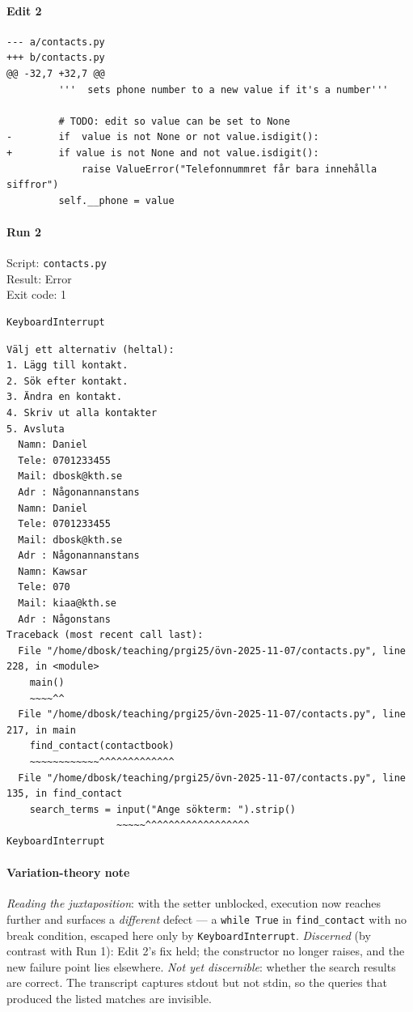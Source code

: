 \documentclass{article}
\begin{document}
\noindent
\begin{minipage}[t]{0.48\linewidth}
\paragraph{Edit 2}
\begin{verbatim}
--- a/contacts.py
+++ b/contacts.py
@@ -32,7 +32,7 @@
         '''  sets phone number to a new value if it's a number'''
 
         # TODO: edit so value can be set to None
-        if  value is not None or not value.isdigit():
+        if value is not None and not value.isdigit():
             raise ValueError("Telefonnummret får bara innehålla siffror")
         self.__phone = value
\end{verbatim}
\end{minipage}
\hfill
\begin{minipage}[t]{0.48\linewidth}
\paragraph{Run 2}
Script: \texttt{contacts.py} \\
Result: Error \\
Exit code: 1

\begin{verbatim}
KeyboardInterrupt
\end{verbatim}

\begin{verbatim}
Välj ett alternativ (heltal):
1. Lägg till kontakt.
2. Sök efter kontakt.
3. Ändra en kontakt.
4. Skriv ut alla kontakter
5. Avsluta
  Namn: Daniel
  Tele: 0701233455
  Mail: dbosk@kth.se
  Adr : Någonannanstans
  Namn: Daniel
  Tele: 0701233455
  Mail: dbosk@kth.se
  Adr : Någonannanstans
  Namn: Kawsar
  Tele: 070
  Mail: kiaa@kth.se
  Adr : Någonstans
Traceback (most recent call last):
  File "/home/dbosk/teaching/prgi25/övn-2025-11-07/contacts.py", line 228, in <module>
    main()
    ~~~~^^
  File "/home/dbosk/teaching/prgi25/övn-2025-11-07/contacts.py", line 217, in main
    find_contact(contactbook)
    ~~~~~~~~~~~~^^^^^^^^^^^^^
  File "/home/dbosk/teaching/prgi25/övn-2025-11-07/contacts.py", line 135, in find_contact
    search_terms = input("Ange sökterm: ").strip()
                   ~~~~~^^^^^^^^^^^^^^^^^^
KeyboardInterrupt
\end{verbatim}
\end{minipage}

\paragraph*{Variation-theory note}
\textit{Reading the juxtaposition}: with the setter unblocked, execution
now reaches further and surfaces a \emph{different} defect --- a
\verb|while True| in \verb|find_contact| with no break condition,
escaped here only by \verb|KeyboardInterrupt|.
\textit{Discerned} (by contrast with Run 1): Edit 2's fix held; the
constructor no longer raises, and the new failure point lies elsewhere.
\textit{Not yet discernible}: whether the search results are correct.
The transcript captures stdout but not stdin, so the queries that
produced the listed matches are invisible.
\end{document}
